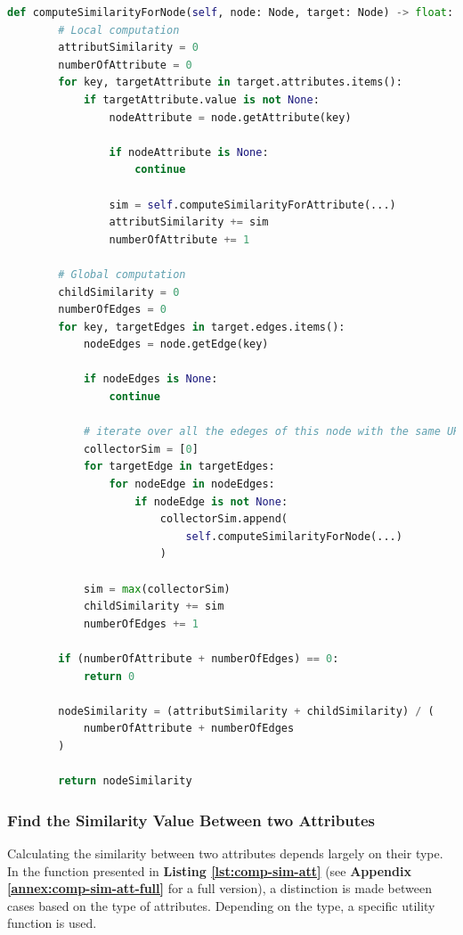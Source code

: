 \begin{lstlisting}[language=Python, caption=Function to Find the Similarity Between Two Cases (Full), label={lst:comp-sim-node}]
def computeSimilarityForNode(self, node: Node, target: Node) -> float:
        # Local computation
        attributSimilarity = 0
        numberOfAttribute = 0
        for key, targetAttribute in target.attributes.items():
            if targetAttribute.value is not None:
                nodeAttribute = node.getAttribute(key)

                if nodeAttribute is None:
                    continue

                sim = self.computeSimilarityForAttribute(...)
                attributSimilarity += sim
                numberOfAttribute += 1

        # Global computation
        childSimilarity = 0
        numberOfEdges = 0
        for key, targetEdges in target.edges.items():
            nodeEdges = node.getEdge(key)

            if nodeEdges is None:
                continue

            # iterate over all the edeges of this node with the same URI
            collectorSim = [0]
            for targetEdge in targetEdges:
                for nodeEdge in nodeEdges:
                    if nodeEdge is not None:
                        collectorSim.append(
                            self.computeSimilarityForNode(...)
                        )

            sim = max(collectorSim)
            childSimilarity += sim
            numberOfEdges += 1

        if (numberOfAttribute + numberOfEdges) == 0:
            return 0

        nodeSimilarity = (attributSimilarity + childSimilarity) / (
            numberOfAttribute + numberOfEdges
        )

        return nodeSimilarity
\end{lstlisting}



\subsubsection{Find the Similarity Value Between two Attributes} 
Calculating the similarity between two attributes depends largely on their type. In the function presented in \textbf{Listing \ref{lst:comp-sim-att}} (see \textbf{Appendix \ref{annex:comp-sim-att-full}} for a full version), a distinction is made between cases based on the type of attributes. Depending on the type, a specific utility function is used.\\

